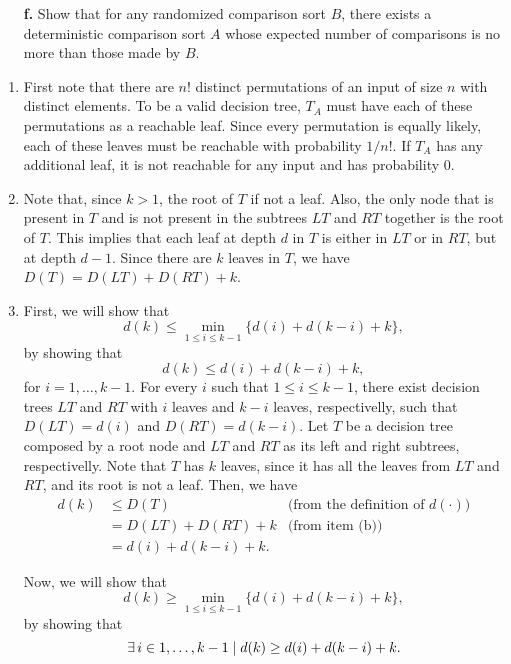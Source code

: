 \begin{enumerate}
{\begin{enumerate}
\item[\textbf{f.}]{Show that for any randomized comparison sort $B$, there
exists a deterministic comparison sort $A$ whose expected number of comparisons
is no more than those made by $B$.}
\end{enumerate}
}

\begin{framed}
\begin{enumerate}

\item{First note that there are $n!$ distinct permutations of an input of size
$n$ with distinct elements. To be a valid decision tree, $T_A$ must have each of
these permutations as a reachable leaf. Since every permutation is equally
likely, each of these leaves must be reachable with probability $1/n!$. If $T_A$
has any additional leaf, it is not reachable for any input and has probability
0.}

\item{Note that, since $k > 1$, the root of $T$ if not a leaf. Also, the only
node that is present in $T$ and is not present in the subtrees $LT$ and $RT$
together is the root of $T$. This implies that each leaf at depth $d$ in $T$ is
either in $LT$ or in $RT$, but at depth $d - 1$. Since there are $k$ leaves in
$T$, we have $D(T) = D(LT) + D(RT) + k$.}

\item{
First, we will show that
\[
  d(k) \le \min_{1 \le i \le k - 1} \{d(i) + d(k - i) + k\},
\]
by showing that
\[
  d(k) \le d(i) + d(k - i) + k,
\]
for $i = 1, \dots, k - 1$. For every $i$ such that $1 \le i \le k - 1$, there
exist decision trees $LT$ and $RT$ with $i$ leaves and $k - i$ leaves,
respectivelly, such that $D(LT) = d(i)$ and $D(RT) = d(k - i)$. Let $T$ be
a decision tree composed by a root node and $LT$ and $RT$ as its left and right
subtrees, respectivelly.  Note that $T$ has $k$ leaves, since it has all the
leaves from $LT$ and $RT$, and its root is not a leaf. Then, we have
\begin{equation*}
\begin{aligned}
  d(k) &\le D(T) & \text{(from the definition of $d(\cdot)$)}\\
       &=   D(LT) + D(RT) + k & \text{(from item (b))}\\
       &= d(i) + d(k - i) + k.
\end{aligned}
\end{equation*}

Now, we will show that
\[
  d(k) \ge \min_{1 \le i \le k - 1} \{d(i) + d(k - i) + k\},
\]
by showing that
\[
  \operatorname{\exists} i \in 1, \dots, k - 1 \; | \; d(k) \ge d(i) + d(k - i) + k.
\]

}
\end{enumerate}
\end{framed}
\end{enumerate}

